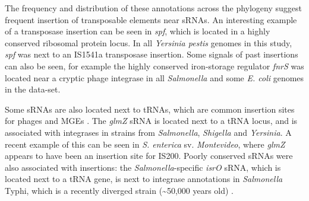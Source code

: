 The frequency and distribution of these annotations across the phylogeny suggest frequent insertion of transposable elements near sRNAs. An interesting example of a transposase insertion can be seen in \textit{spf}, which is located in a highly conserved ribosomal protein locus. In all \textit{Yersinia pestis} genomes in this study, \textit{spf} was next to an IS1541a transposase insertion. Some signals of past insertions can also be seen, for example the highly conserved iron-storage regulator \textit{fnrS} was located near a cryptic phage integrase in all \textit{Salmonella} and some \textit{E. coli} genomes in the data-set.


Some sRNAs are also located next to tRNAs, which are common insertion sites for phages and MGEs \citep{Reiter1989-nr,Williams2002-kj}. The \textit{glmZ} sRNA is located next to a tRNA locus, and is associated with integrases in strains from \textit{Salmonella}, \textit{Shigella} and \textit{Yersinia}. A recent example of this can be seen in \textit{S. enterica} sv. \textit{Montevideo}, where \textit{glmZ} appears to have been an insertion site for IS200. Poorly conserved sRNAs were also associated with insertions: the \textit{Salmonella}-specific \textit{isrO} sRNA, which is located next to a tRNA gene, is next to integrase annotations in \textit{Salmonella} Typhi, which is a recently diverged strain (\textasciitilde50,000 years old) \citep{Kidgell2002-hs}. 

